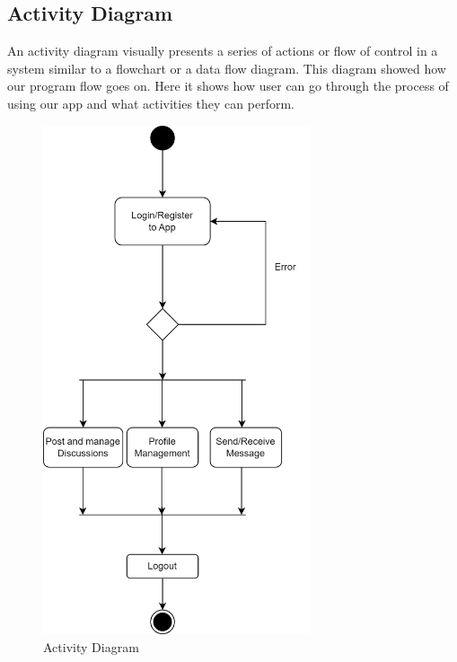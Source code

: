 \subsection{Activity Diagram}
An activity diagram visually presents a series of actions or flow of control in a system similar to a flowchart or a data flow diagram. This diagram showed how our program flow goes on. Here it shows how user can go through the process of using our app and what activities they can perform.
\begin{figure}[H]
   \centering
    \includegraphics[height = 15cm]{Diagrams/Activity.drawio.png}
    \caption{Activity Diagram}
\end{figure}
\newpage
